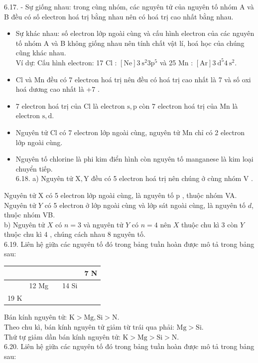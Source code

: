 \documentclass[10pt]{article}
\begin{document}
6.17. - Sự giống nhau: trong cùng nhóm, các nguyên tử của nguyên tố nhóm A và B đều có số electron hoá trị bằng nhau nên có hoá trị cao nhất bằng nhau.

\begin{itemize}
  \item Sự khác nhau: số electron lớp ngoài cùng và cấu hình electron của các nguyên tố nhóm A và B không giống nhau nên tính chất vật lí, hoá học của chúng cũng khác nhau.\\
Ví dự: Cấu hình electron: 17 Cl : $[\mathrm{Ne}] 3 \mathrm{~s}^{2} 3 \mathrm{p}^{5}$ và 25 Mn : $[\mathrm{Ar}] 3 \mathrm{~d}^{5} 4 \mathrm{~s}^{2}$.
  \item Cl và Mn đều có 7 electron hoá trị nên đều có hoá trị cao nhất là 7 và số oxi hoá dương cao nhất là +7 .
  \item 7 electron hoá trị của Cl là electron $\mathrm{s}, \mathrm{p}$ còn 7 electron hoá trị của Mn là electron $\mathrm{s}, \mathrm{d}$.
  \item Nguyên tử Cl có 7 electron lớp ngoài cùng, nguyên tử Mn chỉ có 2 electron lớp ngoài cùng.
  \item Nguyên tố chlorine là phi kim điển hình còn nguyên tố manganese là kim loại chuyển tiếp.\\
6.18. a) Nguyên tử $\mathrm{X}, \mathrm{Y}$ đều có 5 electron hoá trị nên chúng ở cùng nhóm V .
\end{itemize}

Nguyên tử X có 5 electron lớp ngoài cùng, là nguyên tố p , thuộc nhóm VA.\\
Nguyên tử $Y$ có 5 electron ở lớp ngoài cùng và lớp sát ngoài cùng, là nguyên tố $d$, thuộc nhóm VB.\\
b) Nguyên tử $X$ có $n=3$ và nguyên tử $Y$ có $n=4$ nên $X$ thuộc chu kì 3 còn $Y$ thuộc chu kì 4 , chúng cách nhau 8 nguyên tố.\\
6.19. Liên hệ giữa các nguyên tố đó trong bảng tuần hoàn được mô tả trong bảng sau:

\begin{center}
\begin{tabular}{|l|l|l|l|l|}
\hline
 &  &  &  & 7 N \\
\hline
 & 12 Mg &  & 14 Si &  \\
\hline
19 K &  &  &  &  \\
\hline
\end{tabular}
\end{center}

Bán kính nguyên tử: $\mathrm{K}>\mathrm{Mg}, \mathrm{Si}>\mathrm{N}$.\\
Theo chu kì, bán kính nguyên tử giảm từ trái qua phải: $\mathrm{Mg}>\mathrm{Si}$.\\
Thứ tự giảm dần bán kính nguyên tử: $\mathrm{K}>\mathrm{Mg}>\mathrm{Si}>\mathrm{N}$.\\
6.20. Liên hệ giữa các nguyên tố đó trong bảng tuần hoàn được mô tả trong bảng sau:
\end{document}
